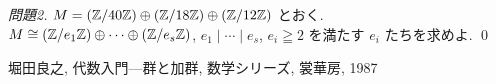 \documentclass[12pt,twoside]{jarticle}
\begin{document}
\begin{proof}[問題2]
 $M=({\mathbb Z}/40{\mathbb Z})\oplus({\mathbb Z}/18{\mathbb Z})\oplus({\mathbb Z}/12{\mathbb Z})$ とおく.
 $M\cong({\mathbb Z}/e_1{\mathbb Z})\oplus\cdots\oplus({\mathbb Z}/e_s{\mathbb Z})$, 
 $e_1\mid\cdots\mid e_s$, $e_i\geqq 2$ を満たす $e_i$ たちを求めよ.
 \qed
\end{proof}



\begin{thebibliography}{AB}

堀田良之, 代数入門---群と加群, 数学シリーズ, 裳華房, 1987


\end{thebibliography}

\end{document}
